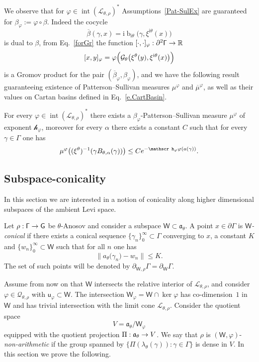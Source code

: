 \documentclass[AHL,Unicode,longabstracts,MathTools]{cedram}
\DeclareMathOperator{\bus}{b}
\DeclareMathOperator{\inte}{int}
\newcommand{\ii}{\mathrm{i}}
\newcommand{\cartan}{a}
\newcommand{\scr}{\mathscr}
\newcommand{\hJ}[1]{{\scr h}_{#1}}
\renewcommand{\sf}[1]{{\mathsf{#1}}}
\newcommand{\sfG}{\sf{G}}
\newcommand{\G}{\sf{\Gamma}}
\newcommand{\cal}{\mathcal}
\newcommand{\Gr}{\cal{G}}
\newcommand{\calL}{\mathcal{L}}
\newcommand{\calQ}{\mathcal{Q}}
\newcommand{\R}{\mathbb{R}}
\newcommand{\g}{\gamma}
\renewcommand{\t}{\theta}
\newcommand{\bord}{\partial}
\newcommand{\ps}{\mu}
\newcommand{\rfr}{\beta}
\newcommand{\ov}{\overline}
\renewcommand{\/}{\backslash}
\newcommand{\<}{\langle}
\renewcommand{\>}{\rangle}
\renewcommand{\a}{\mathfrak{a}}
\renewcommand*{\to}{\mathchoice{\longrightarrow}{\rightarrow}{\rightarrow}{\rightarrow}}
\let\originalleft\left
\let\originalright\right
\renewcommand{\left}{\mathopen{}\mathclose\bgroup\originalleft}
\renewcommand{\right}{\aftergroup\egroup\originalright}
\begin{document}
We observe that for $\varphi\in\inte(\calL_{\t,\rho})^*$ Assumptions~\ref{Pat-SulEx} are guaranteed for $\rfr_\varphi:=\varphi\circ\rfr$. Indeed the cocycle
\[
\ov\rfr{}(\g,x)=\ii\bus_{\ii\t}\big(\g,\xi^{\ii\t}(x)\big)
\]
is dual to $\rfr$, from Eq.~\eqref{forGr} the function $[\cdot,\cdot]_\varphi:\bord^2\G\to\R$
\[
[x,y]_\varphi=\varphi\Bigl(\Gr_\t\left(\xi^\t(y),\xi^{\ii\t}(x)\right)\Bigr)
\]
is a Gromov product for the pair $(\ov\rfr_{\varphi},\rfr_{\varphi})$, and we have the following result guaranteeing existence of Patterson--Sullivan measures $\ps^\varphi$ and $\ov\ps^\varphi$, as well as their values on Cartan basins defined in Eq.~\eqref{e.CartBasin}.

\begin{coro}
\label{existe}
For every $\varphi\in\inte(\calL_{\t,\rho})^*$ there exists a $\rfr_\varphi$-Patterson--Sullivan measure $\ps^\varphi$ of exponent $\hJ\varphi$, moreover for every $\alpha$ there exists a constant $C$ such that for every $\g\in\G$ one has
\[
\ps^\varphi\left((\xi^\theta)^{-1}(\g B_{\theta,\alpha}(\g))\right) \leq Ce^{-\hJ\varphi\varphi(\cartan(\g))}.
\]
\end{coro}



\subsection{Subspace-conicality}\label{sandwich}

In this section we are interested in a notion of conicality along higher dimensional subspaces of the ambient Levi space.

\begin{defi}\label{W-conical}
Let $\rho:\G\to\sfG$ be $\t$-Anosov and consider a subspace $\sf W\subset\a_\t$. A point $x\in\bord\G$ is \emph{$\sf W$-conical} if there exists a conical sequence $\{\g_n\}_0^\infty\subset\G$ converging to $x$, a constant $K$ and $\{w_n\}_0^\infty\subset\sf W$ such that for all $n$ one has
\[
\big\|\cartan_\t\big(\g_n)- w_n\big\|\leq K.
\]
The set of such points will be denoted by $\bord_{\sf W,\rho}\G=\bord_{\sf W}\G$.
\end{defi}


Assume from now on that $\sf W$ intersects the relative interior of $\calL_{\t,\rho}$, and consider $\varphi\in\calQ_{\t,\rho}$ with $\sf u_\varphi\subset\sf W$. The intersection $\sf W_\varphi=\sf W\cap\ker\varphi$ has co-dimension~$1$ in $\sf W$ and has trivial intersection with the limit cone $\calL_{\t,\rho}$. Consider the quotient space
\[
V=\a_\t/\sf W_\varphi
\]
equipped with the quotient projection $\Pi:\a_\t\to V$. We say that $\rho$ is $(\sf W,\varphi)$-\emph{non-arithmetic} if the group spanned by $\{\Pi(\lambda_\t(\g)):\g\in\G\}$ is dense in $V$. In this section we prove the following.
\end{document}
